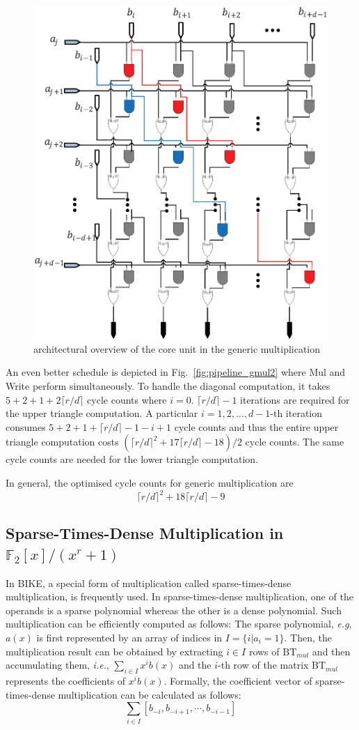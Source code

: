 \documentclass[runningheads]{llncs}
\begin{document}
\begin{figure}[!tb]
\centering
\includegraphics[width=.55\textwidth]{./fig/dsnmul_core.eps}
\caption{architectural overview of the core unit in the generic multiplication}\label{fig:gmul_core}
\end{figure}

An even better schedule is depicted in Fig.~\ref{fig:pipeline_gmul2} where Mul and Write perform simultaneously.
To handle the diagonal computation, it takes $5+2+1+2\lceil r/d\rceil$ cycle counts where $i=0$. $\lceil r/d\rceil -1$ iterations are required for the upper triangle computation. A particular $i=1,2,\ldots,d-1$-th iteration consumes $5+2+1+\lceil r/d\rceil -1-i+1$ cycle counts and thus the entire upper triangle computation costs $(\lceil r/d\rceil^2 +17\lceil r/d\rceil-18)/2$ cycle counts. The same cycle counts are needed for the lower triangle computation.

In general, the optimised cycle counts for generic multiplication are
\[
    \lceil r/d\rceil^2 + 18\lceil r/d\rceil - 9
\]

\subsection{Sparse-Times-Dense Multiplication in $\mathbb{F}_2[x]/(x^r+1)$}
In BIKE, a special form of multiplication called sparse-times-dense multiplication, is frequently used. In sparse-times-dense multiplication, one of the operands is a sparse polynomial whereas the other is a dense polynomial. Such multiplication can be efficiently computed as follows: The sparse polynomial, \textit{e.g}, $a(x)$ is first represented by an array of indices in $I=\{i|a_i=1\}$. Then, the multiplication result can be obtained by extracting $i\in I$ rows of $\text{BT}_{mul}$ and then accumulating them, \textit{i.e.}, $\sum_{i\in I} x^ib(x)$ and the $i$-th row of the matrix $\text{BT}_{mul}$ represents the coefficients of $x^ib(x)$. Formally, the coefficient vector of sparse-times-dense multiplication can be calculated as follows:
\[
    \sum_{i\in I} [b_{-i},b_{-i+1},\cdots,b_{-i-1}]
\]
\end{document}
